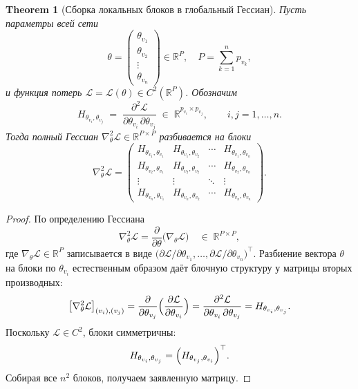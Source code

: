 \documentclass[11pt]{article}
\newtheorem{theorem}{Theorem}
\begin{document}
\begin{theorem}[Сборка локальных блоков в глобальный Гессиан]
  Пусть параметры всей сети
  \[
    \theta =
    \begin{pmatrix}\theta_{v_1}\\ \theta_{v_2}\\ \vdots\\ \theta_{v_n}
    \end{pmatrix}
    \in \mathbb R^P,
    \quad
    P = \sum_{k=1}^n p_{v_k},
  \]
  и функция потерь $\mathcal L=\mathcal L(\theta)\in C^2(\mathbb R^P)$. Обозначим
  \[
    H_{\theta_{v_i},\theta_{v_j}}
    \;=\;
    \frac{\partial^2 \mathcal L}{\partial\theta_{v_i}\,\partial\theta_{v_j}}
    \;\in\;\mathbb R^{p_{v_i}\times p_{v_j}},
    \qquad
    i,j=1,\dots,n.
  \]
  Тогда полный Гессиан $\nabla^2_\theta \mathcal L\in\mathbb R^{P\times P}$
  разбивается на блоки
  \[
    \nabla^2_\theta \mathcal L
    =
    \begin{pmatrix}
      H_{\theta_{v_1},\theta_{v_1}} & H_{\theta_{v_1},\theta_{v_2}} & \cdots & H_{\theta_{v_1},\theta_{v_n}}\\
      H_{\theta_{v_2},\theta_{v_1}} & H_{\theta_{v_2},\theta_{v_2}} & \cdots & H_{\theta_{v_2},\theta_{v_n}}\\
      \vdots & \vdots & \ddots & \vdots\\
      H_{\theta_{v_n},\theta_{v_1}} & H_{\theta_{v_n},\theta_{v_2}} & \cdots & H_{\theta_{v_n},\theta_{v_n}}
    \end{pmatrix}.
  \]
\end{theorem}

\begin{proof}
  По определению Гессиана
  \[
    \nabla^2_\theta \mathcal L
    = \frac{\partial}{\partial\theta}
    \bigl(\nabla_\theta \mathcal L\bigr)
    \quad\in\;\mathbb R^{P\times P},
  \]
  где $\nabla_\theta \mathcal L\in\mathbb R^P$ записывается в виде
  \(\bigl(\partial \mathcal L/\partial\theta_{v_1}, \ldots,
  \partial \mathcal L/\partial\theta_{v_n}\bigr)^\top\).
  Разбиение вектора $\theta$ на блоки по $\theta_{v_i}$ естественным образом
  даёт блочную структуру у матрицы вторых производных:
  \[
    \bigl[\nabla^2_\theta\mathcal L\bigr]_{(v_i),(v_j)}
    = \frac{\partial}{\partial\theta_{v_j}}
    \Bigl(\frac{\partial \mathcal L}{\partial\theta_{v_i}}\Bigr)
    = \frac{\partial^2 \mathcal L}{\partial\theta_{v_i}\,\partial\theta_{v_j}}
    = H_{\theta_{v_i},\theta_{v_j}}.
  \]
  Поскольку $\mathcal L\in C^2$, блоки симметричны:
  \[
    H_{\theta_{v_i},\theta_{v_j}}
    = \Bigl(H_{\theta_{v_j},\theta_{v_i}}\Bigr)^\top.
  \]
  Собирая все $n^2$ блоков, получаем заявленную матрицу.
\end{proof}
\end{document}
